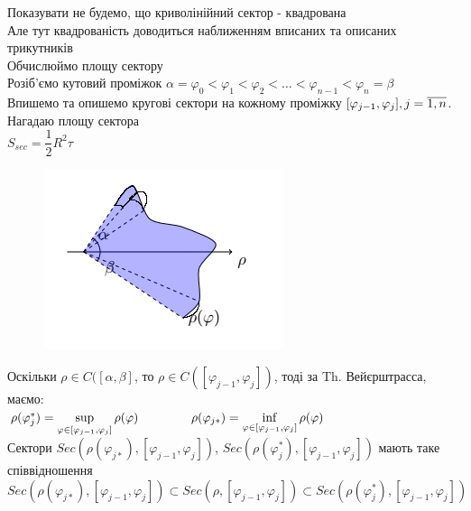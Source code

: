 \documentclass[a4paper, 14pt]{extarticle}
\def\huge{\displaystyle}
\def\bigline{\vspace{5mm}\\}
\theoremstyle{theoremdd}
\theoremstyle{theoremdd}
\theoremstyle{theoremdd}
\theoremstyle{theoremdd}
\theoremstyle{theoremdd}
\theoremstyle{theoremdd}
\theoremstyle{theoremdd}
\theoremstyle{theoremdd}
\begin{document}
Показувати не будемо, що криволінійний сектор - квадрована\\
Але тут квадрованість доводиться наближенням вписаних та описаних трикутників
\bigline
Обчислюймо площу сектору\\
Розіб'ємо кутовий проміжок $\alpha = \varphi_0 < \varphi_1 < \varphi_2 < \dots < \varphi_{n-1} < \varphi_n = \beta$\\
Впишемо та опишемо кругові сектори на кожному проміжку $[\varphi_{j-1}, \varphi_j], \\ j = \overline{1,n}$. Нагадаю площу сектора\\ $S_{sec} = \dfrac{1}{2} R^2 \tau$ \hspace{1cm}
\begin{figure}[H]
\centering
\includegraphics[scale=1]{sector.jpg}
\end{figure}
Оскільки $\rho \in C([\alpha,\beta]$, то $\rho \in C([\varphi_{j-1}, \varphi_j])$, тоді за Th. Вейєрштрасса, маємо:\\
$\rho(\varphi_j^*) = \huge \sup_{\varphi \in [\varphi_{j-1}, \varphi_j]} \rho(\varphi) \hspace{1.5cm} \rho(\varphi_{j*}) = \huge \inf_{\varphi \in [\varphi_{j-1}, \varphi_j]} \rho(\varphi)$\\
Сектори $Sec(\rho(\varphi_{j*}), [\varphi_{j-1}, \varphi_j])$, $Sec(\rho(\varphi^*_{j}), [\varphi_{j-1}, \varphi_j])$ мають таке співвідношення\\
$Sec(\rho(\varphi_{j*}), [\varphi_{j-1}, \varphi_j]) \subset Sec(\rho, [\varphi_{j-1}, \varphi_j]) \subset Sec(\rho(\varphi^*_{j}), [\varphi_{j-1}, \varphi_j])$\\
\end{document}
